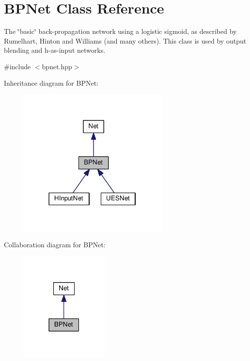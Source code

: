 \hypertarget{classBPNet}{}\section{B\+P\+Net Class Reference}
\label{classBPNet}


The \char`\"{}basic\char`\"{} back-\/propagation network using a logistic sigmoid, as described by Rumelhart, Hinton and Williams (and many others). This class is used by output blending and h-\/as-\/input networks.  




{\ttfamily \#include $<$bpnet.\+hpp$>$}



Inheritance diagram for B\+P\+Net\+:
\nopagebreak
\begin{figure}[H]
\begin{center}
\leavevmode
\includegraphics[width=214pt]{classBPNet__inherit__graph}
\end{center}
\end{figure}


Collaboration diagram for B\+P\+Net\+:
\nopagebreak
\begin{figure}[H]
\begin{center}
\leavevmode
\includegraphics[width=126pt]{classBPNet__coll__graph}
\end{center}
\end{figure}

